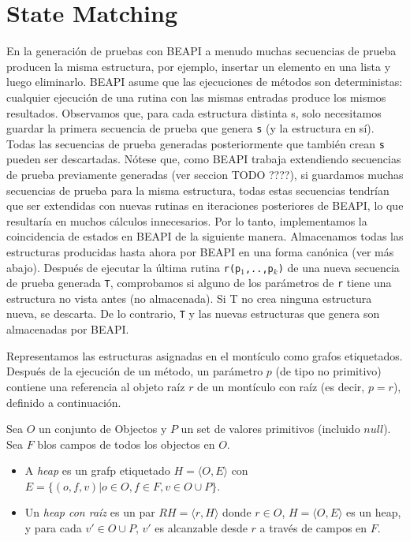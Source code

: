 \section{State Matching}
\label{sec:stateMatching}

En la generación de pruebas con \textsf{BEAPI} a menudo muchas secuencias de prueba producen la misma estructura, por ejemplo, insertar un elemento en una lista y luego eliminarlo. \textsf{BEAPI} asume que las ejecuciones de métodos son deterministas: cualquier ejecución de una rutina con las mismas entradas produce los mismos resultados. Observamos que, para cada estructura distinta s, solo necesitamos guardar la primera secuencia de prueba que genera \texttt{s} (y la estructura en sí). Todas las secuencias de prueba generadas posteriormente que también crean \texttt{s} pueden ser descartadas. Nótese que, como \textsf{BEAPI} trabaja extendiendo secuencias de prueba previamente generadas (ver seccion TODO ????), si guardamos muchas secuencias de prueba para la misma estructura, todas estas secuencias tendrían que ser extendidas con nuevas rutinas en iteraciones posteriores de \textsf{BEAPI}, lo que resultaría en muchos cálculos innecesarios. Por lo tanto, implementamos la coincidencia de estados en \textsf{BEAPI} de la siguiente manera. Almacenamos todas las estructuras producidas hasta ahora por \textsf{BEAPI} en una forma canónica (ver más abajo). Después de ejecutar la última rutina \texttt{r(p$_1$,..,p$_k$)} de una nueva secuencia de prueba generada \texttt{T}, comprobamos si alguno de los parámetros de \texttt{r} tiene una estructura no vista antes (no almacenada). Si T no crea ninguna estructura nueva, se descarta. De lo contrario, \texttt{T} y las nuevas estructuras que genera son almacenadas por \textsf{BEAPI}.

Representamos las estructuras asignadas en el montículo como grafos etiquetados. Después de la ejecución de un método, un parámetro $p$  (de tipo no primitivo) contiene una referencia al objeto raíz $r$ de un montículo con raíz (es decir,  $p=r$), definido a continuación.

\begin{definition}
    Sea $O$ un conjunto de Objectos y $P$ un set de valores primitivos (incluido $null$). Sea $F$ blos campos de todos los objectos en $O$. 
    \begin{itemize}
        \item A \emph{heap} es un grafp etiquetado $H = \langle O,E\rangle$ con $E = \{(o,f,v) | o \in O, f \in F, v \in O \cup P\}$.
        \item Un \emph{heap con raíz} es un par $RH = \langle r, H\rangle$ donde
            $r \in O$, $H = \langle O,E\rangle$ es un heap, y para cada $v' \in O \cup P$, $v'$ es alcanzable desde $r$ a través de campos en $F$.
    \end{itemize}
\end{definition}

